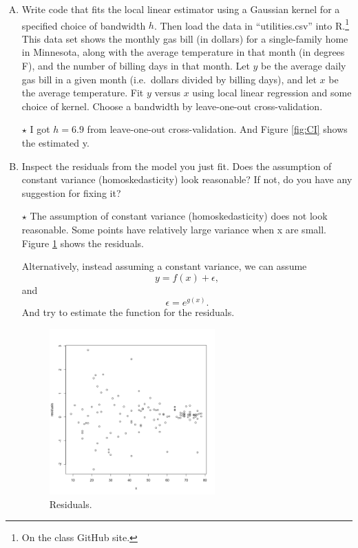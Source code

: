 \documentclass[11pt]{article}
\newcommand{\jie}{$\star$ }
\begin{document}
\begin{enumerate}[(A)]
\item Write code that fits the local linear estimator using a Gaussian kernel for a specified choice of bandwidth $h$. Then load the data in ``utilities.csv'' into R.\footnote{On the class GitHub site.}  This data set shows the monthly gas bill (in dollars) for a single-family home in Minnesota, along with the average temperature in that month (in degrees F), and the number of billing days in that month.  Let $y$ be the average daily gas bill in a given month (i.e.~dollars divided by billing days), and let $x$ be the average temperature.  Fit $y$ versus $x$ using local linear regression and some choice of kernel.  Choose a bandwidth by leave-one-out cross-validation.

\biskip \jie
I got $h=6.9$ from leave-one-out cross-validation. And Figure \ref{fig:CI} shows the estimated y.

\item Inspect the residuals from the model you just fit.  Does the assumption of constant variance (homoskedasticity) look reasonable?  If not, do you have any suggestion for fixing it?

\bigskip \jie
The assumption of constant variance (homoskedasticity) does not look reasonable. Some points have relatively large variance when x are small. Figure \ref{fig:residuals} shows the residuals. 

Alternatively, instead assuming a constant variance, we can assume
$$y = f(x) + \epsilon,$$ and
$$\epsilon = e^{g(x)}.$$
And try to estimate the function for the residuals.
\begin{figure}[h]
    \centering
    \includegraphics[width=0.6\textwidth]{Ex6/figures/residuals.png}
    \caption{Residuals.}
    \label{fig:residuals}
\end{figure}


\end{enumerate}
\end{document}
